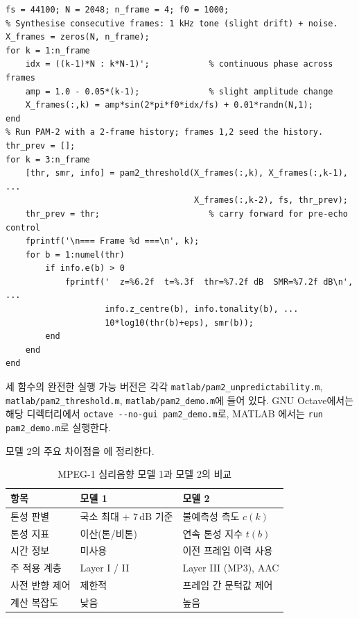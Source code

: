 \documentclass[11pt,a4paper]{article}
\newcommand{\dB}{\ensuremath{\,\mathrm{dB}}}          %
\begin{document}
\begin{lstlisting}[style=matlabstyle,caption={pam2\_demo.m --- driver excerpt: consecutive frames + 2-frame history},label={lst:pam2demo}]
fs = 44100; N = 2048; n_frame = 4; f0 = 1000;
% Synthesise consecutive frames: 1 kHz tone (slight drift) + noise.
X_frames = zeros(N, n_frame);
for k = 1:n_frame
    idx = ((k-1)*N : k*N-1)';            % continuous phase across frames
    amp = 1.0 - 0.05*(k-1);              % slight amplitude change
    X_frames(:,k) = amp*sin(2*pi*f0*idx/fs) + 0.01*randn(N,1);
end
% Run PAM-2 with a 2-frame history; frames 1,2 seed the history.
thr_prev = [];
for k = 3:n_frame
    [thr, smr, info] = pam2_threshold(X_frames(:,k), X_frames(:,k-1), ...
                                      X_frames(:,k-2), fs, thr_prev);
    thr_prev = thr;                      % carry forward for pre-echo control
    fprintf('\n=== Frame %d ===\n', k);
    for b = 1:numel(thr)
        if info.e(b) > 0
            fprintf('  z=%6.2f  t=%.3f  thr=%7.2f dB  SMR=%7.2f dB\n', ...
                    info.z_centre(b), info.tonality(b), ...
                    10*log10(thr(b)+eps), smr(b));
        end
    end
end
\end{lstlisting}

세 함수의 완전한 실행 가능 버전은 각각 \texttt{matlab/pam2\_unpredictability.m},
\texttt{matlab/pam2\_threshold.m}, \texttt{matlab/pam2\_demo.m}에 들어 있다. GNU
Octave에서는 해당 디렉터리에서 \texttt{octave -{}-no-gui pam2\_demo.m}로, MATLAB
에서는 \texttt{run pam2\_demo.m}로 실행한다.

모델 2의 주요 차이점을 에 정리한다.

\begin{table}[htbp]
  \centering
  \caption{MPEG-1 심리음향 모델 1과 모델 2의 비교}
  \label{tab:model12}
  \begin{tabular}{@{}lll@{}}
    \toprule
    항목 & 모델 1 & 모델 2 \\
    \midrule
    톤성 판별      & 국소 최대 + $7\dB$ 기준 & 불예측성 측도 $c(k)$ \\
    톤성 지표      & 이산(톤/비톤)            & 연속 톤성 지수 $t(b)$ \\
    시간 정보      & 미사용                   & 이전 프레임 이력 사용 \\
    주 적용 계층   & Layer I / II             & Layer III (MP3), AAC \\
    사전 반향 제어 & 제한적                   & 프레임 간 문턱값 제어 \\
    계산 복잡도    & 낮음                     & 높음 \\
    \bottomrule
  \end{tabular}
\end{table}
\end{document}

